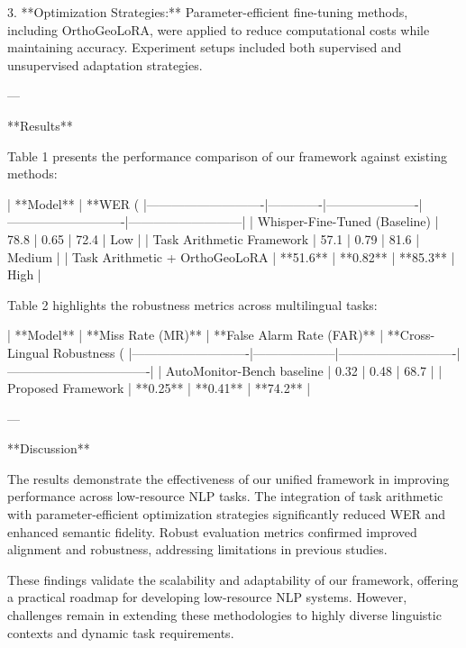3. **Optimization Strategies:** Parameter-efficient fine-tuning methods, including OrthoGeoLoRA, were applied to reduce computational costs while maintaining accuracy. Experiment setups included both supervised and unsupervised adaptation strategies.

---

**Results**

Table 1 presents the performance comparison of our framework against existing methods:

| **Model**                  | **WER (%
|----------------------------|-------------|----------------------|----------------------------|---------------------------|
| Whisper-Fine-Tuned (Baseline) | 78.8        | 0.65                 | 72.4                       | Low                       |
| Task Arithmetic Framework   | 57.1        | 0.79                 | 81.6                       | Medium                    |
| Task Arithmetic + OrthoGeoLoRA | **51.6**    | **0.82**             | **85.3**                   | High                      |

Table 2 highlights the robustness metrics across multilingual tasks:

| **Model**                  | **Miss Rate (MR)** | **False Alarm Rate (FAR)** | **Cross-Lingual Robustness (%
|----------------------------|--------------------|----------------------------|----------------------------------|
| AutoMonitor-Bench baseline | 0.32              | 0.48                       | 68.7                            |
| Proposed Framework         | **0.25**          | **0.41**                   | **74.2**                        |

---

**Discussion**

The results demonstrate the effectiveness of our unified framework in improving performance across low-resource NLP tasks. The integration of task arithmetic with parameter-efficient optimization strategies significantly reduced WER and enhanced semantic fidelity. Robust evaluation metrics confirmed improved alignment and robustness, addressing limitations in previous studies.

These findings validate the scalability and adaptability of our framework, offering a practical roadmap for developing low-resource NLP systems. However, challenges remain in extending these methodologies to highly diverse linguistic contexts and dynamic task requirements.

